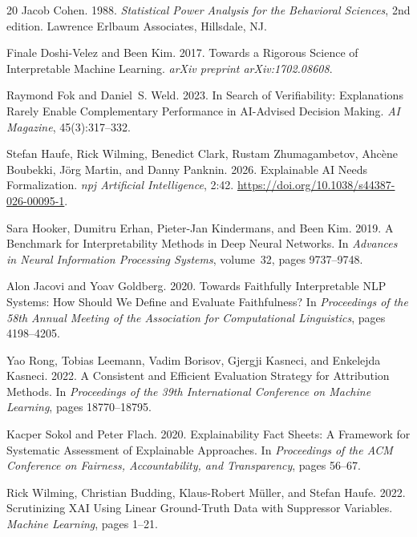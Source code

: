 \documentclass[twoside,11pt]{article}
\begin{document}
\begin{thebibliography}{20}
Jacob Cohen.
1988.
\emph{Statistical Power Analysis for the Behavioral Sciences}, 2nd edition.
Lawrence Erlbaum Associates, Hillsdale, NJ.

Finale Doshi-Velez and Been Kim.
2017.
Towards a Rigorous Science of Interpretable Machine Learning.
\emph{arXiv preprint arXiv:1702.08608}.

Raymond Fok and Daniel~S. Weld.
2023.
In Search of Verifiability: Explanations Rarely Enable Complementary Performance
in {AI}-Advised Decision Making.
\emph{AI Magazine}, 45(3):317--332.

Stefan Haufe, Rick Wilming, Benedict Clark, Rustam Zhumagambetov, Ahc\`ene
Boubekki, J{\"o}rg Martin, and Danny Panknin.
2026.
Explainable {AI} Needs Formalization.
\emph{npj Artificial Intelligence}, 2:42.
\url{https://doi.org/10.1038/s44387-026-00095-1}.

Sara Hooker, Dumitru Erhan, Pieter-Jan Kindermans, and Been Kim.
2019.
A Benchmark for Interpretability Methods in Deep Neural Networks.
In \emph{Advances in Neural Information Processing Systems}, volume~32,
pages 9737--9748.

Alon Jacovi and Yoav Goldberg.
2020.
Towards Faithfully Interpretable {NLP} Systems: How Should We Define and Evaluate
Faithfulness?
In \emph{Proceedings of the 58th Annual Meeting of the Association for
Computational Linguistics}, pages 4198--4205.

Yao Rong, Tobias Leemann, Vadim Borisov, Gjergji Kasneci, and Enkelejda Kasneci.
2022.
A Consistent and Efficient Evaluation Strategy for Attribution Methods.
In \emph{Proceedings of the 39th International Conference on Machine Learning},
pages 18770--18795.

Kacper Sokol and Peter Flach.
2020.
Explainability Fact Sheets: A Framework for Systematic Assessment of Explainable
Approaches.
In \emph{Proceedings of the ACM Conference on Fairness, Accountability, and
Transparency}, pages 56--67.

Rick Wilming, Christian Budding, Klaus-Robert M{\"u}ller, and Stefan Haufe.
2022.
Scrutinizing {XAI} Using Linear Ground-Truth Data with Suppressor Variables.
\emph{Machine Learning}, pages 1--21.


\end{thebibliography}
\end{document}
